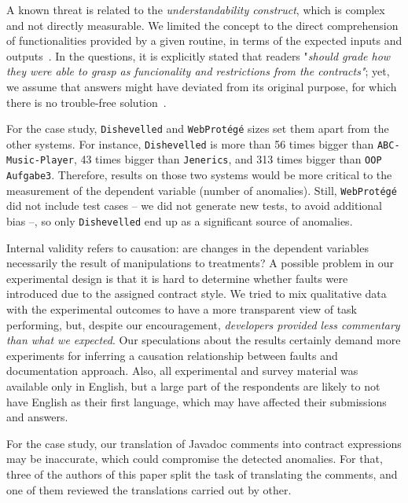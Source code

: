 A known threat is related to the \emph{understandability construct}, which is complex and not directly measurable. We limited the concept to the direct comprehension of functionalities provided by a given routine, in terms of the expected inputs and outputs~\cite{4019969}. In the questions, it is explicitly stated that readers "\emph{should grade how they were able to grasp as funcionality and restrictions from the contracts"}; yet, we assume that answers might have deviated from its original purpose, for which there is no trouble-free solution~\cite{Scalabrino2017}.



For the case study, \texttt{Dishevelled} and
\texttt{WebProt\'{e}g\'{e}} sizes set them apart from the other systems.
For instance, \texttt{Dishevelled} is more than 56 times bigger than \texttt{ABC-Music-Player}, 43
times bigger than \texttt{Jenerics}, and 313 times bigger than \texttt{OOP Aufgabe3}.
Therefore, results on those two systems would be more critical to the measurement of the dependent variable (number of anomalies).
Still, \texttt{WebProt\'{e}g\'{e}} did not include test cases -- we did not generate new tests, to avoid additional bias --, so only \texttt{Dishevelled} end up as a significant source of anomalies.


Internal validity refers to causation: are changes in the dependent variables necessarily the result of manipulations to treatments? A possible problem in our experimental design is that it is hard to determine whether faults were introduced due to the assigned contract style. We tried to mix qualitative data with the experimental outcomes to have a more transparent view of task performing, but, despite our encouragement, \emph{developers provided less commentary than what we expected}. Our speculations about the results certainly demand more experiments for inferring a causation relationship between faults and documentation approach.
Also, all experimental and survey material was available only in English, but a large part of the respondents are likely to not have English as their first language, which may have affected their
submissions and answers.

For the case study, our translation of Javadoc comments into contract expressions may be inaccurate, which could compromise the detected anomalies. For that, three of the authors of this paper split the task of translating the comments, and one of them reviewed the translations carried out by other. 



